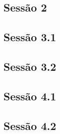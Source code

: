 \documentclass[a4paper,12pt]{article}
\begin{document}
\subsection{Sessão 2}
{
\scriptsize

}

\subsection{Sessão 3.1}
{
\scriptsize

}

\subsection{Sessão 3.2}
{
\scriptsize

}

\subsection{Sessão 4.1}
{
\scriptsize

}

\subsection{Sessão 4.2}
{
\scriptsize

}
\end{document}
